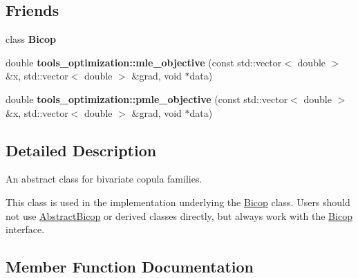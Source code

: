 \subsection*{Friends}
\begin{DoxyCompactItemize}
\item 
class {\bfseries Bicop}\hypertarget{classvinecopulib_1_1_abstract_bicop_af3db9e73153fd7fa7bb69657e7cb949d}{}\label{classvinecopulib_1_1_abstract_bicop_af3db9e73153fd7fa7bb69657e7cb949d}

\item 
double {\bfseries tools\+\_\+optimization\+::mle\+\_\+objective} (const std\+::vector$<$ double $>$ \&x, std\+::vector$<$ double $>$ \&grad, void $\ast$data)\hypertarget{classvinecopulib_1_1_abstract_bicop_ac0e8ae7fffff069ed9476a97d8bfac19}{}\label{classvinecopulib_1_1_abstract_bicop_ac0e8ae7fffff069ed9476a97d8bfac19}

\item 
double {\bfseries tools\+\_\+optimization\+::pmle\+\_\+objective} (const std\+::vector$<$ double $>$ \&x, std\+::vector$<$ double $>$ \&grad, void $\ast$data)\hypertarget{classvinecopulib_1_1_abstract_bicop_ae671e9f66df15a190329d53c802f70ef}{}\label{classvinecopulib_1_1_abstract_bicop_ae671e9f66df15a190329d53c802f70ef}

\end{DoxyCompactItemize}


\subsection{Detailed Description}
An abstract class for bivariate copula families. 

This class is used in the implementation underlying the \hyperlink{classvinecopulib_1_1_bicop}{Bicop} class. Users should not use \hyperlink{classvinecopulib_1_1_abstract_bicop}{Abstract\+Bicop} or derived classes directly, but always work with the \hyperlink{classvinecopulib_1_1_bicop}{Bicop} interface. 

\subsection{Member Function Documentation}
